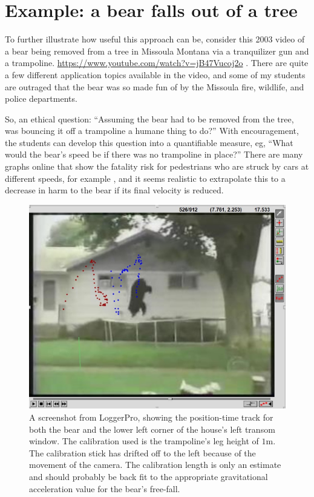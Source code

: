 \documentclass[12pt]{iopart}
\begin{document}
\clearpage

\section{Example: a bear falls out of a tree}
To further illustrate how useful this approach can be, consider this 2003 video of a bear being removed from a tree in Missoula Montana via a tranquilizer gun and a trampoline. \url{https://www.youtube.com/watch?v=jB47Vucoj2o} \cite{bear_video_source}.  
There are quite a few different application topics available in the video, and some of my students are outraged that the bear was so made fun of by the Missoula fire, wildlife, and police departments.  

So, an ethical question: ``Assuming the bear had to be removed from the tree, was bouncing it off a trampoline a humane thing to do?''  With encouragement, the students can develop this question into a quantifiable measure, eg, ``What would the bear's speed be if there was no trampoline in place?''  There are many graphs online that show the fatality risk for pedestrians who are struck by cars at different speeds, for example \cite{AccidentRisk}, and it seems realistic to extrapolate this to a decrease in harm to the bear if its final velocity is reduced.

\begin{figure}[h]
\centering
\includegraphics[width=\columnwidth]{figure_6_bear-dots.jpg}
\caption{
A screenshot from LoggerPro, showing the position-time track for both the bear and the lower left corner of the house's left transom window. The calibration used is the trampoline's leg height of $1$m.  The calibration stick has drifted off to the left because of the movement of the camera.  The calibration length is only an estimate and should probably be back fit to the appropriate gravitational acceleration value for the bear's free-fall.
}
\label{bear-dots}
\end{figure}
\end{document}
